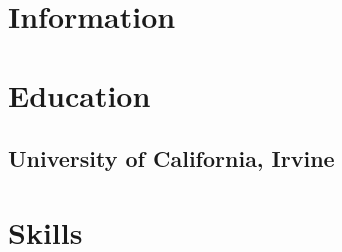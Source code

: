 \begin{aside}

  \section{Information}
  \vspace{3.5mm}
  \makesideheader{}

  \section{Education}
    \vspace{-0.5mm}
    \subsection{University of California, Irvine}
    \begin{flushleft}
    \end{flushleft}
    \begin{flushright}
      \vspace{-0.5mm}
    \end{flushright}

  \section{Skills}
    \vspace{-0.5mm}


\end{aside}
